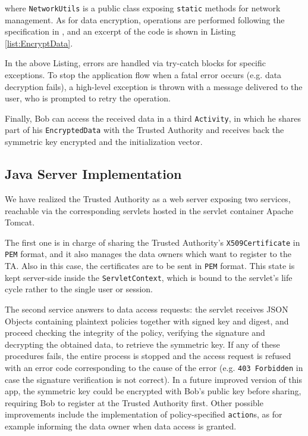 \noindent where \texttt{NetworkUtils} is a public class exposing \texttt{static} methods for network management. As for data encryption, operations are performed following the specification in \cite{mont2003towards}, and an excerpt of the code is shown in Listing \ref{list:EncryptData}.


In the above Listing, errors are handled via try-catch blocks for specific exceptions. To stop the application flow when a fatal error occurs (e.g. data decryption fails), a high-level exception is thrown with a message delivered to the user, who is prompted to retry the operation.

Finally, Bob can access the received data in a third \texttt{Activity}, in which he shares part of his \texttt{EncryptedData} with the Trusted Authority and receives back the symmetric key encrypted and the initialization vector.

\subsection{Java Server Implementation}

We have realized the Trusted Authority as a web server exposing two services, reachable via the corresponding servlets hosted in the servlet container Apache Tomcat.

The first one is in charge of sharing the Trusted Authority's \texttt{X509Certificate} in \texttt{PEM} format, and it also manages the data owners which want to register to the TA. Also in this case, the certificates are to be sent in \texttt{PEM} format. This state is kept server-side inside the \texttt{ServletContext}, which is bound to the servlet's life cycle rather to the single user or session.

The second service answers to data access requests: the servlet receives JSON Objects containing plaintext policies together with signed key and digest, and proceed checking the integrity of the policy, verifying the signature and decrypting the obtained data, to retrieve the symmetric key. If any of these procedures fails, the entire process is stopped and the access request is refused with an error code corresponding to the cause of the error (e.g. \texttt{403 Forbidden} in case the signature verification is not correct). In a future improved version of this app, the symmetric key could be encrypted with Bob's public key before sharing, requiring Bob to register at the Trusted Authority first. Other possible improvements include the implementation of policy-specified \texttt{action}s, as for example informing the data owner when data access is granted.

